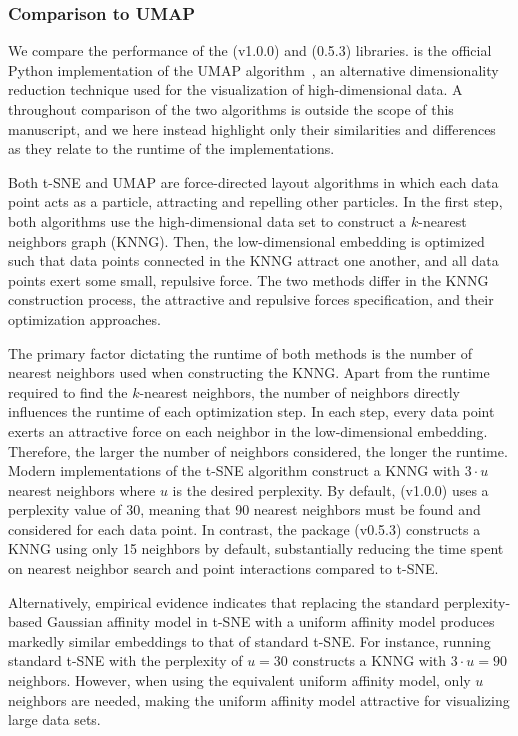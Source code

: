 \documentclass[article]{jss}
\newcommand{\opentsne}{\pkg{openTSNE}\xspace}
\begin{document}
\subsubsection{Comparison to UMAP}

We compare the performance of the \opentsne (v1.0.0) and  (0.5.3) libraries.  is the official \textsf{Python} implementation of the UMAP algorithm~\citep{2018arXivUMAP}, an alternative dimensionality reduction technique used for the visualization of high-dimensional data. A throughout comparison of the two algorithms is outside the scope of this manuscript, and we here instead highlight only their similarities and differences as they relate to the runtime of the implementations.

Both t-SNE and UMAP are force-directed layout algorithms in which each data point acts as a particle, attracting and repelling other particles. In the first step, both algorithms use the high-dimensional data set to construct a $k$-nearest neighbors graph (KNNG). Then, the low-dimensional embedding is optimized such that data points connected in the KNNG attract one another, and all data points exert some small, repulsive force. The two methods differ in the KNNG construction process, the attractive and repulsive forces specification, and their optimization approaches.

The primary factor dictating the runtime of both methods is the number of nearest neighbors used when constructing the KNNG. Apart from the runtime required to find the $k$-nearest neighbors, the number of neighbors directly influences the runtime of each optimization step. In each step, every data point exerts an attractive force on each neighbor in the low-dimensional embedding. Therefore, the larger the number of neighbors considered, the longer the runtime. Modern implementations of the t-SNE algorithm construct a KNNG with $3 \cdot u$ nearest neighbors where $u$ is the desired perplexity. By default, \opentsne (v1.0.0) uses a perplexity value of 30, meaning that 90 nearest neighbors must be found and considered for each data point. In contrast, the  package (v0.5.3) constructs a KNNG using only 15 neighbors by default, substantially reducing the time spent on nearest neighbor search and point interactions compared to t-SNE.

Alternatively, empirical evidence indicates that replacing the standard perplexity-based Gaussian affinity model in t-SNE with a uniform affinity model produces markedly similar embeddings to that of standard t-SNE. For instance, running standard t-SNE with the perplexity of $u=30$ constructs a KNNG with $3 \cdot u = 90$ neighbors. However, when using the equivalent uniform affinity model, only $u$ neighbors are needed, making the uniform affinity model attractive for visualizing large data sets.
\end{document}
